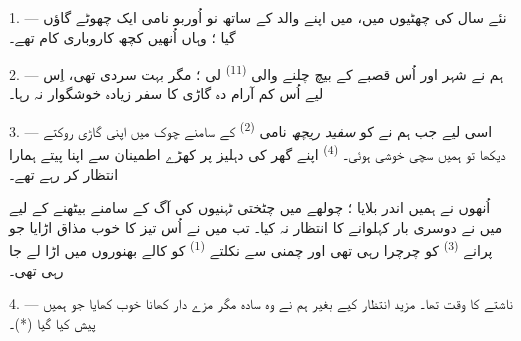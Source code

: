 %

\VUsaut{4.0mm}
\VUsaut{3.0mm}
\VUfilet{16mm}
\VUsaut{5.6mm}
\VUsaut{3.0mm}

\VUsaut{3.0mm}

\VUsaut{4.0mm}

1. --- نئے سال کی چھٹیوں میں، میں اپنے والد کے ساتھ نو اُوربو نامی
ایک چھوٹے گاؤں گیا ؛ وہاں اُنھیں کچھ کاروباری کام تھے۔

2. --- ہم نے شہر اور اُس قصبے کے بیچ چلنے والی 
\textsuperscript{(11)} لی ؛ مگر بہت سردی تھی، اِس لیے اُس کم آرام دہ
گاڑی کا سفر زیادہ خوشگوار نہ رہا۔

3. --- اسی لیے جب ہم نے  کو \textit{سفید ریچھ} نامی
 \textsuperscript{(2)} کے سامنے چوک میں اپنی گاڑی
روکتے دیکھا تو ہمیں سچی خوشی ہوئی۔ 
\textsuperscript{(4)} اپنے گھر کی دہلیز پر کھڑے اطمینان سے اپنا
 پیتے ہمارا انتظار کر رہے تھے۔

اُنھوں نے ہمیں اندر بلایا ؛ چولھے میں چٹختی ٹہنیوں کی آگ کے سامنے
بیٹھنے کے لیے میں نے دوسری بار کہلوانے کا انتظار نہ کیا۔ تب میں نے
اُس تیز  کا خوب مذاق اڑایا جو پرانے
 \textsuperscript{(3)} کو چرچرا رہی تھی اور چمنی سے
نکلتے  \textsuperscript{(1)} کو کالے بھنوروں میں اڑا
لے جا رہی تھی۔

4. --- ناشتے کا وقت تھا۔ مزید انتظار کیے بغیر ہم نے وہ سادہ مگر مزے
دار کھانا خوب کھایا جو ہمیں پیش کیا گیا (*)۔

